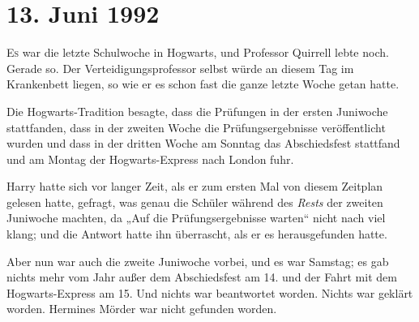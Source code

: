 
\section{13. Juni 1992}

\lettrine{E}{s} war die letzte Schulwoche in Hogwarts, und Professor Quirrell lebte noch. Gerade so. Der Verteidigungsprofessor selbst würde an diesem Tag im Krankenbett liegen, so wie er es schon fast die ganze letzte Woche getan hatte.

Die Hogwarts-Tradition besagte, dass die Prüfungen in der ersten Juniwoche stattfanden, dass in der zweiten Woche die Prüfungsergebnisse veröffentlicht wurden und dass in der dritten Woche am Sonntag das Abschiedsfest stattfand und am Montag der Hogwarts-Express nach London fuhr.

Harry hatte sich vor langer Zeit, als er zum ersten Mal von diesem Zeitplan gelesen hatte, gefragt, was genau die Schüler während des \emph{Rests} der zweiten Juniwoche machten, da
„Auf die Prüfungsergebnisse warten“ nicht nach viel klang; und die Antwort hatte ihn überrascht, als er es herausgefunden hatte.


Aber nun war auch die zweite Juniwoche vorbei, und es war Samstag; es gab nichts mehr vom Jahr außer dem Abschiedsfest am 14. und der Fahrt mit dem Hogwarts-Express am 15. Und nichts war beantwortet worden. Nichts war geklärt worden. Hermines Mörder war nicht gefunden worden.


